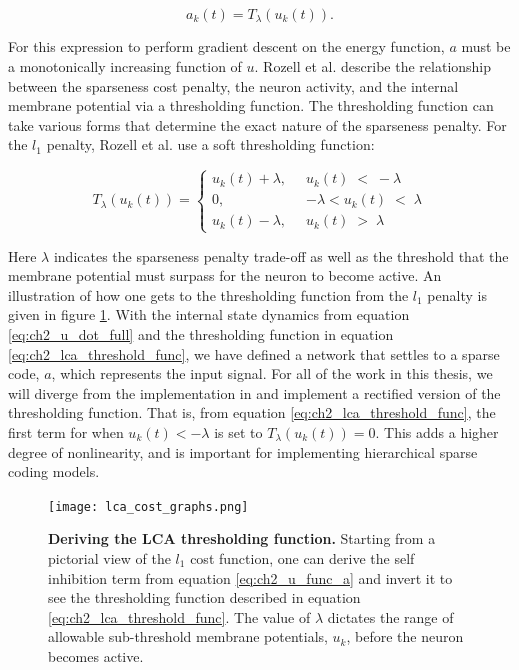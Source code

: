 \begin{equation}\label{eq:ch2_a_thresh}
  a_{k}(t) = T_{\lambda}(u_{k}(t)).
\end{equation}

For this expression to perform gradient descent on the energy function, $a$ must be a monotonically increasing function of $u$. Rozell et al. \citeyearpar{rozell2008sparse} describe the relationship between the sparseness cost penalty, the neuron activity, and the internal membrane potential via a thresholding function. The thresholding function can take various forms that determine the exact nature of the sparseness penalty. For the $l_{1}$ penalty, Rozell et al. \citeyearpar{rozell2008sparse} use a soft thresholding function:

\begin{equation}\label{eq:ch2_lca_threshold_func}
    T_{\lambda}(u_{k}(t)) = \left\{
    \begin{aligned}
        u_{k}(t)+\lambda,\;\; &u_{k}(t)\; <\; -\lambda \\
        0,\;\; &-\lambda < u_{k}(t)\; <\; \lambda \\
        u_{k}(t)-\lambda,\;\; &u_{k}(t)\; >\; \lambda
    \end{aligned}
    \right.
\end{equation}

Here $\lambda$ indicates the sparseness penalty trade-off as well as the threshold that the membrane potential must surpass for the neuron to become active. An illustration of how one gets to the thresholding function from the $l_{1}$ penalty is given in figure \ref{fig:ch2_lca_thresh}. With the internal state dynamics from equation \eqref{eq:ch2_u_dot_full} and the thresholding function in equation \eqref{eq:ch2_lca_threshold_func}, we have defined a network that settles to a sparse code, $a$, which represents the input signal. For all of the work in this thesis, we will diverge from the implementation in \parencite{rozell2008sparse} and implement a rectified version of the thresholding function. That is, from equation \eqref{eq:ch2_lca_threshold_func}, the first term for when $u_{k}(t) < -\lambda$ is set to $T_{\lambda}(u_{k}(t))=0$. This adds a higher degree of nonlinearity, and is important for implementing hierarchical sparse coding models.

\begin{figure}[h]
    \centering %
    \texttt{[image: lca\_cost\_graphs.png]}
    \caption{\textbf{Deriving the LCA thresholding function.} Starting from a pictorial view of the $l_{1}$ cost function, one can derive the self inhibition term from equation \eqref{eq:ch2_u_func_a} and invert it to see the thresholding function described in equation \eqref{eq:ch2_lca_threshold_func}. The value of $\lambda$ dictates the range of allowable sub-threshold membrane potentials, $u_{k}$, before the neuron becomes active.}
    \label{fig:ch2_lca_thresh}
\end{figure}

